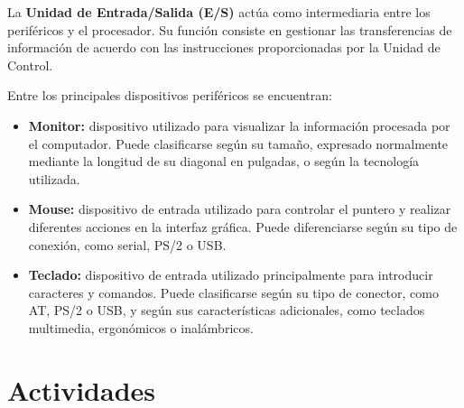 \documentclass[10pt]{article}
\begin{document}
La \textbf{Unidad de Entrada/Salida (E/S)} actúa como intermediaria entre los periféricos y el procesador. Su función consiste en gestionar las transferencias de información de acuerdo con las instrucciones proporcionadas por la Unidad de Control.

Entre los principales dispositivos periféricos se encuentran:

\begin{itemize}
\item \textbf{Monitor:} dispositivo utilizado para visualizar la información procesada por el computador. Puede clasificarse según su tamaño, expresado normalmente mediante la longitud de su diagonal en pulgadas, o según la tecnología utilizada.

\item \textbf{Mouse:} dispositivo de entrada utilizado para controlar el puntero y realizar diferentes acciones en la interfaz gráfica. Puede diferenciarse según su tipo de conexión, como serial, PS/2 o USB.

\item \textbf{Teclado:} dispositivo de entrada utilizado principalmente para introducir caracteres y comandos. Puede clasificarse según su tipo de conector, como AT, PS/2 o USB, y según sus características adicionales, como teclados multimedia, ergonómicos o inalámbricos.

\end{itemize}


\section{Actividades}
\end{document}
